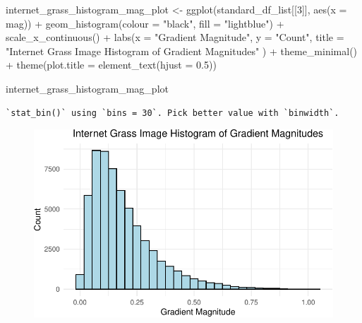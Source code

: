 \documentclass[
  letterpaper,
  DIV=11,
  numbers=noendperiod]{scrreprt}
\newenvironment{Shaded}{\begin{snugshade}}{\end{snugshade}}
\newcommand{\AttributeTok}[1]{\textcolor[rgb]{0.40,0.45,0.13}{#1}}
\newcommand{\DecValTok}[1]{\textcolor[rgb]{0.68,0.00,0.00}{#1}}
\newcommand{\FloatTok}[1]{\textcolor[rgb]{0.68,0.00,0.00}{#1}}
\newcommand{\FunctionTok}[1]{\textcolor[rgb]{0.28,0.35,0.67}{#1}}
\newcommand{\NormalTok}[1]{\textcolor[rgb]{0.00,0.23,0.31}{#1}}
\newcommand{\OtherTok}[1]{\textcolor[rgb]{0.00,0.23,0.31}{#1}}
\newcommand{\SpecialCharTok}[1]{\textcolor[rgb]{0.37,0.37,0.37}{#1}}
\newcommand{\StringTok}[1]{\textcolor[rgb]{0.13,0.47,0.30}{#1}}
\begin{document}
\begin{Shaded}
\begin{Highlighting}[]
\NormalTok{internet\_grass\_histogram\_mag\_plot }\OtherTok{\textless{}{-}}
  \FunctionTok{ggplot}\NormalTok{(standard\_df\_list[[}\DecValTok{3}\NormalTok{]], }\FunctionTok{aes}\NormalTok{(}\AttributeTok{x =}\NormalTok{ mag)) }\SpecialCharTok{+}
  \FunctionTok{geom\_histogram}\NormalTok{(}\AttributeTok{colour =} \StringTok{"black"}\NormalTok{, }\AttributeTok{fill =} \StringTok{"lightblue"}\NormalTok{) }\SpecialCharTok{+}
  \FunctionTok{scale\_x\_continuous}\NormalTok{() }\SpecialCharTok{+} 
  \FunctionTok{labs}\NormalTok{(}\AttributeTok{x =} \StringTok{"Gradient Magnitude"}\NormalTok{, }
       \AttributeTok{y =} \StringTok{"Count"}\NormalTok{, }
       \AttributeTok{title =} \StringTok{"Internet Grass Image Histogram of Gradient Magnitudes"}
\NormalTok{       ) }\SpecialCharTok{+}
  \FunctionTok{theme\_minimal}\NormalTok{() }\SpecialCharTok{+}
  \FunctionTok{theme}\NormalTok{(}\AttributeTok{plot.title =} \FunctionTok{element\_text}\NormalTok{(}\AttributeTok{hjust =} \FloatTok{0.5}\NormalTok{))}

\NormalTok{internet\_grass\_histogram\_mag\_plot}
\end{Highlighting}
\end{Shaded}

\begin{verbatim}
`stat_bin()` using `bins = 30`. Pick better value with `binwidth`.
\end{verbatim}

\begin{figure}[H]

{\centering \includegraphics{results_files/figure-pdf/unnamed-chunk-11-1.pdf}

}

\end{figure}
\end{document}
